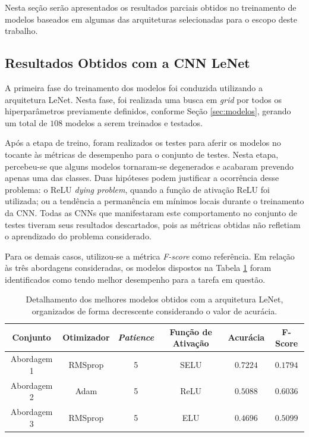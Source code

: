 
Nesta seção serão apresentados os resultados parciais obtidos no treinamento de modelos baseados em algumas das arquiteturas selecionadas para o escopo deste trabalho. 




\subsection{Resultados Obtidos com a CNN LeNet}
\label{sec:lenet}

A primeira fase do treinamento dos modelos foi conduzida utilizando a arquitetura LeNet. Nesta fase, foi realizada uma busca em \emph{grid} por todos os hiperparâmetros previamente definidos, conforme Seção \ref{sec:modelos}, gerando um total de $108$ modelos a serem treinados e testados.

Após a etapa de treino, foram realizados os testes para aferir os modelos no tocante às métricas de desempenho para o conjunto de testes. Nesta etapa, percebeu-se que alguns modelos tornaram-se degenerados e acabaram prevendo apenas uma das classes. Duas hipóteses podem justificar a ocorrência desse problema: o ReLU \emph{dying problem}, quando a função de ativação ReLU foi utilizada; ou a tendência a permanência em mínimos locais durante o treinamento da CNN. Todas as CNNs que manifestaram este comportamento no conjunto de testes tiveram seus resultados descartados, pois as métricas obtidas não refletiam o aprendizado do problema considerado.

Para os demais casos, utilizou-se a métrica \emph{F-score} como referência. Em relação às três abordagens consideradas, os modelos dispostos na Tabela \ref{tab:lenet} foram identificados como tendo melhor desempenho para a tarefa em questão.

\begin{table}[h!]
\centering
\caption{Detalhamento dos melhores modelos obtidos com a arquitetura LeNet, organizados de forma decrescente considerando o valor de acurácia.}
\label{tab:lenet}
\begin{tabular}{cccccc}
\toprule
\textbf{Conjunto} & \textbf{Otimizador} & \textbf{\emph{Patience}}  & \textbf{Função de Ativação} & \textbf{Acurácia} & \textbf{F-Score} \\
\midrule
Abordagem 1 & RMSprop & 5 & SELU & $0.7224$ & $0.1794$ \\
Abordagem 2 & Adam & 5 & ReLU & $0.5088$ & $0.6036$ \\
Abordagem 3 & RMSprop & 5 & ELU & $0.4696$ & $0.5099$ \\
\bottomrule
\end{tabular}
\end{table}


